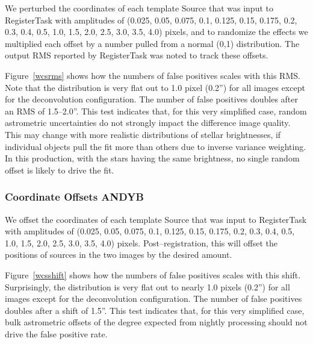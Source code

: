 \documentclass[prd, nofootinbib, floatfix, 11pt,tightenlines,times]{article}
\begin{document}
We perturbed the coordinates of each template Source that was input to
RegisterTask with amplitudes of (0.025, 0.05, 0.075, 0.1, 0.125, 0.15,
0.175, 0.2, 0.3, 0.4, 0.5, 1.0, 1.5, 2.0, 2.5, 3.0, 3.5, 4.0) pixels,
and to randomize the effects we multiplied each offset by a number
pulled from a normal (0,1) distribution.  The output RMS reported by
RegisterTask was noted to track these offsets.  

Figure~\ref{wcsrms} shows how the numbers of false positives scales
with this RMS.  Note that the distribution is very flat out to 1.0
pixel (0.2'') for all images except for the deconvolution
configuration.  The number of false positives doubles after an RMS of
1.5--2.0''.  This test indicates that, for this very simplified case,
random astrometric uncertainties do not strongly impact the difference
image quality.  This may change with more realistic distributions of
stellar brightnesses, if individual objects pull the fit more than
others due to inverse variance weighting.  In this production, with the
stars having the same brightness, no single random offset is likely to
drive the fit.

\subsubsection{Coordinate Offsets {\bf ANDYB}}

We offset the coordinates of each template Source that was input to
RegisterTask with amplitudes of (0.025, 0.05, 0.075, 0.1, 0.125, 0.15,
0.175, 0.2, 0.3, 0.4, 0.5, 1.0, 1.5, 2.0, 2.5, 3.0, 3.5, 4.0) pixels.
Post--registration, this will offset the positions of sources in the
two images by the desired amount.

Figure~\ref{wcsshift} shows how the numbers of false positives scales
with this shift.  Surprisingly, the distribution is very flat out to
nearly 1.0 pixels (0.2'') for all images except for the deconvolution
configuration.  The number of false positives doubles after a shift of
1.5''.  This test indicates that, for this very simplified case, bulk
astrometric offsets of the degree expected from nightly processing
should not drive the false positive rate.  
\end{document}
